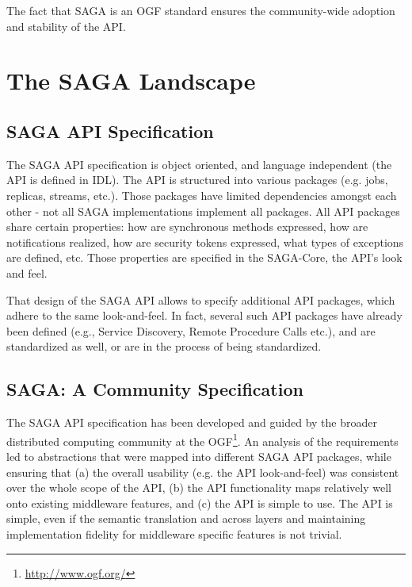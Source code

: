 \documentclass[12pt]{article}
\begin{document}
The fact that SAGA is an OGF standard ensures the community-wide
adoption and stability of the
API.  %

\section{The SAGA Landscape}

 \subsection{SAGA API Specification}

  The SAGA API specification is object oriented, and language
  independent (the API is defined in IDL).  The API is structured into
  various packages (e.g. jobs, replicas, streams, etc.).  Those
  packages have limited dependencies amongst each other - not all SAGA
  implementations implement all packages.  All API packages share
  certain properties: how are synchronous methods expressed, how are
  notifications realized, how are security tokens expressed, what
  types of exceptions are defined, etc.  Those properties are
  specified in the SAGA-Core, the API's look and feel.

  That design of the SAGA API allows to specify additional API
  packages, which adhere to the same look-and-feel.  In fact, several
  such API packages have already been defined (e.g., Service
  Discovery, Remote Procedure Calls etc.), and are standardized as
  well, or are in the process of being standardized.

 \subsection{SAGA: A Community Specification}

  The SAGA API specification has been developed and guided by the
  broader distributed computing community at the
  OGF\footnote{\url{http://www.ogf.org/}}.  An analysis of the
  requirements led to abstractions that were mapped into different
  SAGA API packages, while ensuring that (a) the overall usability
  (e.g. the API look-and-feel) was consistent over the whole scope of
  the API, (b) the API functionality maps relatively well onto
  existing middleware features, and (c) the API is simple to use.  The
  API is simple, even if the semantic translation and across layers
  and maintaining implementation fidelity for middleware specific
  features is not trivial.
\end{document}
